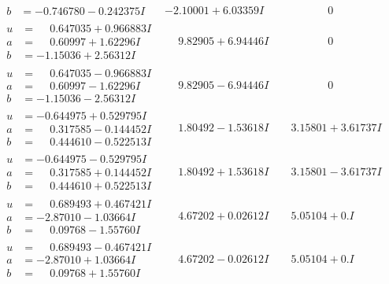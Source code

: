 \documentclass[1p]{elsarticle_modified}
\theoremstyle{definition}
\begin{document}
$$\begin{array}{c|c|c}
\begin{aligned}
b &= -0.746780 - 0.242375 I\end{aligned}
 & -2.10001 + 6.03359 I & \phantom{-0.000000 } 0 \\ \hline\begin{aligned}
u &= \phantom{-}0.647035 + 0.966883 I \\
a &= \phantom{-}0.60997 + 1.62296 I \\
b &= -1.15036 + 2.56312 I\end{aligned}
 & \phantom{-}9.82905 + 6.94446 I & \phantom{-0.000000 } 0 \\ \hline\begin{aligned}
u &= \phantom{-}0.647035 - 0.966883 I \\
a &= \phantom{-}0.60997 - 1.62296 I \\
b &= -1.15036 - 2.56312 I\end{aligned}
 & \phantom{-}9.82905 - 6.94446 I & \phantom{-0.000000 } 0 \\ \hline\begin{aligned}
u &= -0.644975 + 0.529795 I \\
a &= \phantom{-}0.317585 - 0.144452 I \\
b &= \phantom{-}0.444610 - 0.522513 I\end{aligned}
 & \phantom{-}1.80492 - 1.53618 I & \phantom{-}3.15801 + 3.61737 I \\ \hline\begin{aligned}
u &= -0.644975 - 0.529795 I \\
a &= \phantom{-}0.317585 + 0.144452 I \\
b &= \phantom{-}0.444610 + 0.522513 I\end{aligned}
 & \phantom{-}1.80492 + 1.53618 I & \phantom{-}3.15801 - 3.61737 I \\ \hline\begin{aligned}
u &= \phantom{-}0.689493 + 0.467421 I \\
a &= -2.87010 - 1.03664 I \\
b &= \phantom{-}0.09768 - 1.55760 I\end{aligned}
 & \phantom{-}4.67202 + 0.02612 I & \phantom{-}5.05104 + 0. I\phantom{ +0.000000I} \\ \hline\begin{aligned}
u &= \phantom{-}0.689493 - 0.467421 I \\
a &= -2.87010 + 1.03664 I \\
b &= \phantom{-}0.09768 + 1.55760 I\end{aligned}
 & \phantom{-}4.67202 - 0.02612 I & \phantom{-}5.05104 + 0. I\phantom{ +0.000000I}\\

\end{array}$$
\end{document}
